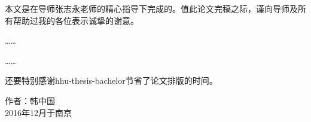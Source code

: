 
\begin{acknowledgement}

本文是在导师张志永老师的精心指导下完成的。值此论文完稿之际，谨向导师及所有帮助过我的各位表示诚挚的谢意。\par
……\par
……\par
还要特别感谢hhu-thesis-bachelor节省了论文排版的时间。
\vspace{5cm}
\begin{flushright}
	作者：韩中国\\
	2016年12月于南京
\end{flushright}

\end{acknowledgement}

